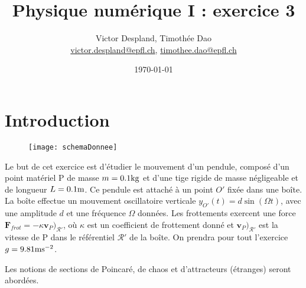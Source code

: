\documentclass[a4paper,12pt,oneside]{article}
\newcommand{\mail}[1]{{\href{mailto:#1}{#1}}}
\begin{document}
\title{Physique numérique I : exercice 3}
\date{\today}
\author{Victor Despland, Timothée Dao\\{\small \mail{victor.despland@epfl.ch}, \mail{timothee.dao@epfl.ch}}}
\maketitle
\tableofcontents



\newpage
\newpage \section{Introduction}

\intextsep=-0.5cm
\begin{wrapfigure}{r}{0.4\textwidth}
    \centering
    \texttt{[image: schemaDonnee]}
    \caption{\cite{donneeEX2}}
\end{wrapfigure}


Le but de cet exercice est d'étudier le mouvement d'un pendule, composé d'un point matériel P de masse $m=0.1\rm kg$ et d'une tige rigide de masse négligeable et de longueur $L=0.1\rm m$. Ce pendule est attaché à un point $O'$ fixée dans une boîte. La boîte effectue un mouvement oscillatoire verticale $y_{O'}(t) = d \sin(\Omega t)$, avec une amplitude $d$ et une fréquence $\Omega$ données. Les frottements exercent une force $\mathbf{F}_{frot}=-\kappa \mathbf{v}_P)_\mathcal{R'}$, où $\kappa$ est un coefficient de frottement donné et $\textbf{v}_P)_\mathcal{R'}$ est la vitesse de P dans le référentiel $\mathcal{R'}$ de la boîte. On prendra pour tout l'exercice $g=9.81 \rm ms^{-2}$.

Les notions de sections de Poincaré, de chaos et d'attracteurs (étranges) seront abordées.

\intextsep=0.5cm



\end{document}
